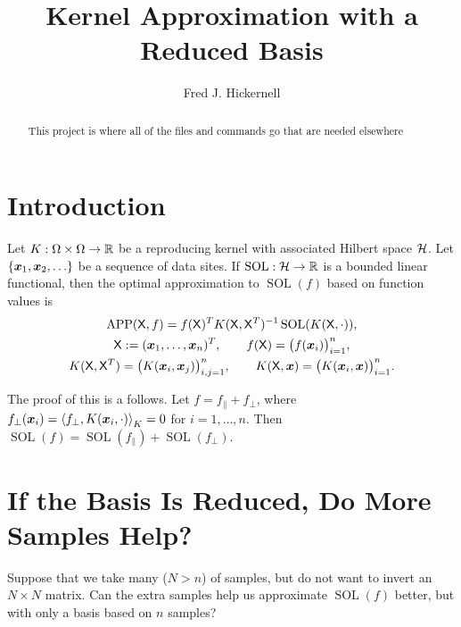 \documentclass{amsart}
\DeclareMathOperator{\SOL}{SOL}
\DeclareMathOperator{\APP}{APP}
\begin{document}
\title{Kernel Approximation with a Reduced Basis}
\author{Fred J. Hickernell}
\begin{abstract}This project is where all of the files and commands go that are needed elsewhere
\end{abstract}

\maketitle

\section{Introduction}\label{sec:intro}
Let $K:\Omega \times \Omega \to \reals$ be a reproducing kernel with associated Hilbert space $\ch$. Let $\{\vx_1, \vx_2, \ldots\}$ be a sequence of data sites.  If $\SOL: \ch \to \reals$ is a bounded linear functional, then the optimal approximation to $\SOL(f)$ based on function values  is 
\begin{subequations}  \label{eq:bestappx}
\begin{gather}
    \APP(\mX,f) =  f(\mX)^T K(\mX,\mX^T)^{-1}\SOL(K(\mX,\cdot)), \\
    \mX := (\vx_1, \dots, \vx_n)^T, \qquad  f(\mX) = \bigl(f(\vx_i) \bigr)_{i=1}^n, \\
    K(\mX,\mX^T) = \bigl(K(\vx_i,\vx_j)\bigr)_{i,j=1}^n, \qquad
     K(\mX,\vx) = \bigl(K(\vx_i,\vx)\bigr)_{i=1}^n.
\end{gather}
\end{subequations}

The proof of this is a follows.  Let $f = f_{\parallel} + f_{\perp}$, where $f_{\perp}(\vx_i) =\ip[K]{f_{\perp}}{K(\vx_i,\cdot)} = 0$ for $i = 1, \ldots, n$.  Then $\SOL(f) = \SOL(f_{\parallel}) + \SOL(f_{\perp})$.

\section{If the Basis Is Reduced, Do More Samples Help?}
Suppose that we take many ($N > n$) of samples, but do not want to invert an $N \times N$ matrix.  Can the extra samples help us approximate $\SOL(f)$ better, but with only a basis based on $n$ samples?



\end{document}
